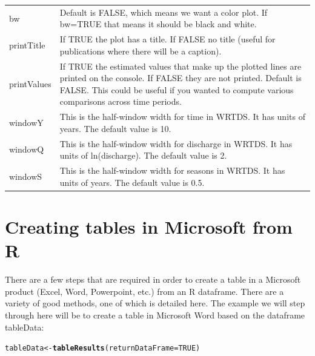 \documentclass[a4paper,11pt]{article}\usepackage[]{graphicx}\usepackage[]{color}
\makeatletter
\newcommand{\hlnum}[1]{\textcolor[rgb]{0.686,0.059,0.569}{#1}}%
\newcommand{\hlstd}[1]{\textcolor[rgb]{0.345,0.345,0.345}{#1}}%
\newcommand{\hlkwb}[1]{\textcolor[rgb]{0.69,0.353,0.396}{#1}}%
\newcommand{\hlkwc}[1]{\textcolor[rgb]{0.333,0.667,0.333}{#1}}%
\newcommand{\hlkwd}[1]{\textcolor[rgb]{0.737,0.353,0.396}{\textbf{#1}}}%
\newenvironment{kframe}{%
 \def\at@end@of@kframe{}%
 \ifinner\ifhmode%
  \def\at@end@of@kframe{\end{minipage}}%
  \begin{minipage}{\columnwidth}%
 \fi\fi%
 \def\FrameCommand##1{\hskip\@totalleftmargin \hskip-\fboxsep
 \colorbox{shadecolor}{##1}\hskip-\fboxsep
     \hskip-\linewidth \hskip-\@totalleftmargin \hskip\columnwidth}%
 \MakeFramed {\advance\hsize-\width
   \@totalleftmargin\z@ \linewidth\hsize
   \@setminipage}}%
 {\par\unskip\endMakeFramed%
 \at@end@of@kframe}
\newenvironment{knitrout}{}{} %
\makeatother
\begin{document}
\begin{table}[ht]
\begin{tabularx}{\textwidth}{lX}
bw & Default is FALSE, which means we want a color plot.  If bw=TRUE that means it should be black and white.\\
printTitle & If TRUE the plot has a title.  If FALSE no title (useful for publications where there will be a caption).\\
printValues & If TRUE the estimated values that make up the plotted lines are printed on the console.  If FALSE they are not printed.  Default is FALSE.  This could be useful if you wanted to compute various comparisons across time periods.\\
windowY & This is the half-window width for time in WRTDS.  It has units of years.  The default value is 10. \\
windowQ & This is the half-window width for discharge in WRTDS.  It has units of ln(discharge).  The default value is 2. \\
windowS & This is the half-window width for seasons in WRTDS.  It has units of years.  The default value is 0.5. \\
\hline
\end{tabularx}

\end{table}

\FloatBarrier


\section{Creating tables in Microsoft from R}
\label{app:createWordTable}
There are a few steps that are required in order to create a table in a Microsoft product (Excel, Word, Powerpoint, etc.) from an R dataframe. There are a variety of good methods, one of which is detailed here. The example we will step through here will be to create a table in Microsoft Word based on the dataframe tableData:

\begin{knitrout}
\color{fgcolor}\begin{kframe}
\begin{alltt}
\hlstd{tableData} \hlkwb{<-} \hlkwd{tableResults}\hlstd{(}\hlkwc{returnDataFrame}\hlstd{=}\hlnum{TRUE}\hlstd{)}
\end{alltt}
\end{kframe}
\end{knitrout}
\end{document}

